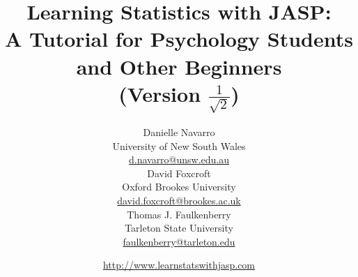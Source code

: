 


\date{\url{http://www.learnstatswithjasp.com} \hfill \\ }
\title{Learning Statistics with JASP:\\ A Tutorial for Psychology Students and Other Beginners \vspace*{18pt}
\\ (Version $\displaystyle{\frac{1}{\sqrt{2}}}$) \\ \vspace*{24pt}}
\author{Danielle Navarro \\ University of New South Wales \\ \url{d.navarro@unsw.edu.au} \vspace*{18pt} \\
David Foxcroft \\ Oxford Brookes University \\ \url{david.foxcroft@brookes.ac.uk} \vspace*{18pt} \\
Thomas J. Faulkenberry \\ Tarleton State University \\ \url{faulkenberry@tarleton.edu}\vspace*{36pt}}


 